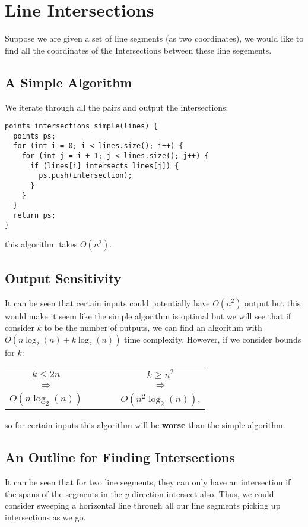 \documentclass[a4paper, 12pt, twoside]{article}
\begin{document}
\section{Line Intersections}

Suppose we are given a set of line segments (as two coordinates), we would
like to find all the coordinates of the Intersections between these line
segements.

\subsection{A Simple Algorithm}

We iterate through all the pairs and output the intersections:
\begin{lstlisting}
points intersections_simple(lines) {
  points ps;
  for (int i = 0; i < lines.size(); i++) {
    for (int j = i + 1; j < lines.size(); j++) {
      if (lines[i] intersects lines[j]) {
        ps.push(intersection);
      }
    }    
  }
  return ps;
}
\end{lstlisting} this algorithm takes $O(n^2)$.

\subsection{Output Sensitivity}

It can be seen that certain inputs could potentially have $O(n^2)$ output
but this would make it seem like the simple algorithm is optimal but we
will see that if consider $k$ to be the number of outputs, we can find
an algorithm with $O(n\log_2(n) + k\log_2(n))$ time complexity. However,
if we consider bounds for $k$:
\begin{center}
  \begin{tabular}{ c c c }
    $k \leq 2n$     & $\qquad$ & $k \geq n^2$ \\
    $\Rightarrow$   & $\qquad$ & $\Rightarrow$ \\
    $O(n\log_2(n))$ & $\qquad$ & $O(n^2\log_2(n))$,
  \end{tabular}
\end{center} so for certain inputs this algorithm will be \textbf{worse}
than the simple algorithm.

\subsection{An Outline for Finding Intersections}

It can be seen that for two line segments, they can only have an intersection
if the spans of the segments in the $y$ direction intersect also. Thus,
we could consider sweeping a horizontal line through all our line segments
picking up intersections as we go.
\end{document}
